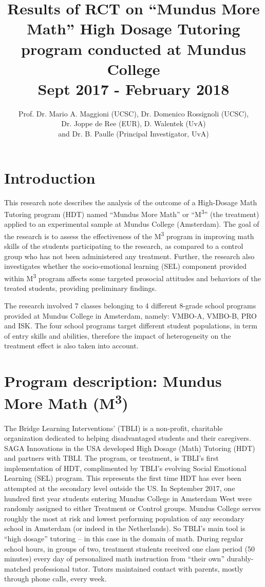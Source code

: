 \documentclass[ 12 pt]{article}
\title{Results of RCT on “Mundus More Math” High Dosage Tutoring program conducted at Mundus College \\ \Large Sept 2017 \-- February 2018}
\author{Prof. Dr. Mario A. Maggioni (UCSC), Dr. Domenico Rossignoli (UCSC), \\ Dr. Joppe de Ree (EUR), D. Walentek (UvA) \\ and Dr. B. Paulle (Principal Investigator, UvA)}
\begin{document}
\sffamily
\maketitle

\section{Introduction}
This research note describes the analysis of the outcome of a High-Dosage Math Tutoring program (HDT) named \enquote{Mundus More Math} or \enquote{M\textsuperscript{3}} (the treatment) applied to an experimental sample at Mundus College (Amsterdam). The goal of the research is to assess the effectiveness of the M\textsuperscript{3} program in improving math skills of the students participating to the research, as compared to a control group who has not been administered any treatment. Further, the research also investigates whether the socio-emotional learning (SEL) component provided within M\textsuperscript{3} program affects some targeted prosocial attitudes and behaviors of the treated students, providing preliminary findings.

The research involved 7 classes belonging to 4 different 8-grade school programs provided at Mundus College in Amsterdam, namely: VMBO-A, VMBO-B, PRO and ISK. The four school programs target different student populations, in term of entry skills and abilities, therefore the impact of heterogeneity on the treatment effect is also taken into account.

\section{Program description: Mundus More Math (M\textsuperscript{3})}
\label{sec:program}
The Bridge Learning Interventions’ (TBLI) is a non-profit, charitable organization dedicated to helping disadvantaged students and their caregivers. SAGA Innovations in the USA developed High Dosage (Math) Tutoring (HDT) and partners with TBLI. The program, or treatment, is TBLI’s first implementation of HDT, complimented by TBLI’s evolving Social Emotional Learning (SEL) program. This represents the first time HDT has ever been attempted at the secondary level outside the US. In September 2017, one hundred first year students entering Mundus College in Amsterdam West were randomly assigned to either Treatment or Control groups. Mundus College serves roughly the most at risk and lowest performing population of any secondary school in Amsterdam (or indeed in the Netherlands). 
So TBLI’s main tool is \enquote{high dosage} tutoring – in this case in the domain of math. During regular school hours, in groups of two, treatment students received one class period (50 minutes) every day of personalized math instruction from \enquote{their own} durably-matched professional tutor. Tutors maintained contact with parents, mostly through phone calls, every week. 
\end{document}
